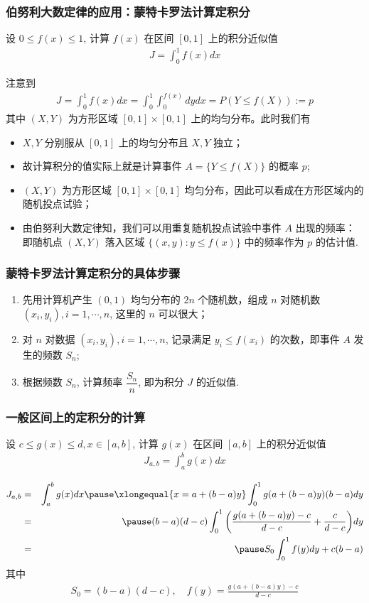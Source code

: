 \begin{frame}
	\frametitle{伯努利大数定律的应用：蒙特卡罗法计算定积分}
	\begin{prob}
		设 $0\le f (x)\le 1$, 计算 $f (x)$ 在区间 $[0,1]$ 上的积分近似值
		\begin{eqnarray*}
			J=\int_0^1f(x)dx
		\end{eqnarray*}
	\end{prob}
	\pause \jieda 注意到
	\begin{eqnarray*}
		J=\int_0^1f(x)dx=\int_0^1\int_0^{f(x)}dydx=P(Y\le f(X)):=p
	\end{eqnarray*}
	其中 $(X,Y)$ 为方形区域 $[0,1]\times [0,1]$ 上的均匀分布。此时我们有 \pause
	\begin{itemize}[<+-|alert@+>]
		\item $X,Y$ 分别服从 $[0,1]$ 上的均匀分布且 $X,Y$ 独立；
		\item 故计算积分的值实际上就是计算事件 $A=\{Y\le f (X)\}$ 的概率 $p$;
		\item $(X,Y)$ 为方形区域 $[0,1]\times [0,1]$ 均匀分布，因此可以看成在方形区域内的随机投点试验；
		\item 由伯努利大数定律知，我们可以用重复随机投点试验中事件 $A$ 出现的频率：即随机点 $(X,Y)$ 落入区域 $\{(x,y):y\le f (x)\}$ 中的频率作为 $p$ 的估计值.

	\end{itemize}
\end{frame}
\begin{frame}
	\frametitle{蒙特卡罗法计算定积分的具体步骤}
	\begin{enumerate}[<+-|alert@+>]
		\item 先用计算机产生 $(0,1)$ 均匀分布的 $2n$ 个随机数，组成 $n$ 对随机数 $(x_i,y_i),i=1,\cdots,n$, 这里的 $n$ 可以很大；
		\item 对 $n$ 对数据 $(x_i,y_i), i=1,\cdots,n$, 记录满足 $y_i\le f (x_i)$ 的次数，即事件 $A$ 发生的频数 $S_n$;
		\item 根据频数 $S_n$, 计算频率 $\dfrac{S_n}{n}$, 即为积分 $J$ 的近似值.
	\end{enumerate}
\end{frame}
\begin{frame}
	\frametitle{一般区间上的定积分的计算}
	\begin{prob}
		设 $c\le g (x)\le d, x\in [a,b]$, 计算 $g (x)$ 在区间 $[a,b]$ 上的积分近似值
		\begin{eqnarray*}
			J_{a,b}=\int_a^bg(x)dx
		\end{eqnarray*}
	\end{prob}
	\pause \jieda
	\begin{eqnarray*}
		J_{a,b}&=&\int_a^bg(x)dx\pause \xlongequal{x=a+(b-a)y} \int_0^1g(a+(b-a)y)(b-a)dy\\
		&=&\pause (b-a)(d-c)\int_0^1\bigg(\frac{g(a+(b-a)y)-c}{d-c}+\frac{c}{d-c}\bigg)dy\\
		&=&\pause S_0\int_0^1f(y)dy+c(b-a)
	\end{eqnarray*}
	其中
	\begin{eqnarray*}
		S_0=(b-a)(d-c), \quad f(y)=\frac{g(a+(b-a)y)-c}{d-c}
	\end{eqnarray*}

\end{frame}

